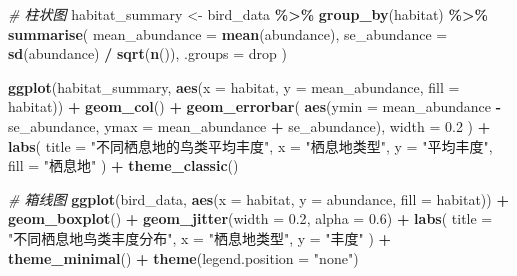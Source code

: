 \documentclass[
  twoside]{book}
\newenvironment{Shaded}{\begin{snugshade}}{\end{snugshade}}
\newcommand{\AttributeTok}[1]{\textcolor[rgb]{0.13,0.29,0.53}{#1}}
\newcommand{\CommentTok}[1]{\textcolor[rgb]{0.56,0.35,0.01}{\textit{#1}}}
\newcommand{\FloatTok}[1]{\textcolor[rgb]{0.00,0.00,0.81}{#1}}
\newcommand{\FunctionTok}[1]{\textcolor[rgb]{0.13,0.29,0.53}{\textbf{#1}}}
\newcommand{\NormalTok}[1]{#1}
\newcommand{\OtherTok}[1]{\textcolor[rgb]{0.56,0.35,0.01}{#1}}
\newcommand{\SpecialCharTok}[1]{\textcolor[rgb]{0.81,0.36,0.00}{\textbf{#1}}}
\newcommand{\StringTok}[1]{\textcolor[rgb]{0.31,0.60,0.02}{#1}}
\begin{document}
\begin{Shaded}
\begin{Highlighting}[]
\CommentTok{\# 柱状图}
\NormalTok{habitat\_summary }\OtherTok{\textless{}{-}}\NormalTok{ bird\_data }\SpecialCharTok{\%\textgreater{}\%}
  \FunctionTok{group\_by}\NormalTok{(habitat) }\SpecialCharTok{\%\textgreater{}\%}
  \FunctionTok{summarise}\NormalTok{(}
    \AttributeTok{mean\_abundance =} \FunctionTok{mean}\NormalTok{(abundance),}
    \AttributeTok{se\_abundance =} \FunctionTok{sd}\NormalTok{(abundance) }\SpecialCharTok{/} \FunctionTok{sqrt}\NormalTok{(}\FunctionTok{n}\NormalTok{()),}
    \AttributeTok{.groups =} \StringTok{\textquotesingle{}drop\textquotesingle{}}
\NormalTok{  )}

\FunctionTok{ggplot}\NormalTok{(habitat\_summary, }\FunctionTok{aes}\NormalTok{(}\AttributeTok{x =}\NormalTok{ habitat, }\AttributeTok{y =}\NormalTok{ mean\_abundance, }\AttributeTok{fill =}\NormalTok{ habitat)) }\SpecialCharTok{+}
  \FunctionTok{geom\_col}\NormalTok{() }\SpecialCharTok{+}
  \FunctionTok{geom\_errorbar}\NormalTok{(}
    \FunctionTok{aes}\NormalTok{(}\AttributeTok{ymin =}\NormalTok{ mean\_abundance }\SpecialCharTok{{-}}\NormalTok{ se\_abundance, }
        \AttributeTok{ymax =}\NormalTok{ mean\_abundance }\SpecialCharTok{+}\NormalTok{ se\_abundance),}
    \AttributeTok{width =} \FloatTok{0.2}
\NormalTok{  ) }\SpecialCharTok{+}
  \FunctionTok{labs}\NormalTok{(}
    \AttributeTok{title =} \StringTok{"不同栖息地的鸟类平均丰度"}\NormalTok{,}
    \AttributeTok{x =} \StringTok{"栖息地类型"}\NormalTok{,}
    \AttributeTok{y =} \StringTok{"平均丰度"}\NormalTok{,}
    \AttributeTok{fill =} \StringTok{"栖息地"}
\NormalTok{  ) }\SpecialCharTok{+}
  \FunctionTok{theme\_classic}\NormalTok{()}

\CommentTok{\# 箱线图}
\FunctionTok{ggplot}\NormalTok{(bird\_data, }\FunctionTok{aes}\NormalTok{(}\AttributeTok{x =}\NormalTok{ habitat, }\AttributeTok{y =}\NormalTok{ abundance, }\AttributeTok{fill =}\NormalTok{ habitat)) }\SpecialCharTok{+}
  \FunctionTok{geom\_boxplot}\NormalTok{() }\SpecialCharTok{+}
  \FunctionTok{geom\_jitter}\NormalTok{(}\AttributeTok{width =} \FloatTok{0.2}\NormalTok{, }\AttributeTok{alpha =} \FloatTok{0.6}\NormalTok{) }\SpecialCharTok{+}
  \FunctionTok{labs}\NormalTok{(}
    \AttributeTok{title =} \StringTok{"不同栖息地鸟类丰度分布"}\NormalTok{,}
    \AttributeTok{x =} \StringTok{"栖息地类型"}\NormalTok{,}
    \AttributeTok{y =} \StringTok{"丰度"}
\NormalTok{  ) }\SpecialCharTok{+}
  \FunctionTok{theme\_minimal}\NormalTok{() }\SpecialCharTok{+}
  \FunctionTok{theme}\NormalTok{(}\AttributeTok{legend.position =} \StringTok{"none"}\NormalTok{)}
\end{Highlighting}
\end{Shaded}
\end{document}
